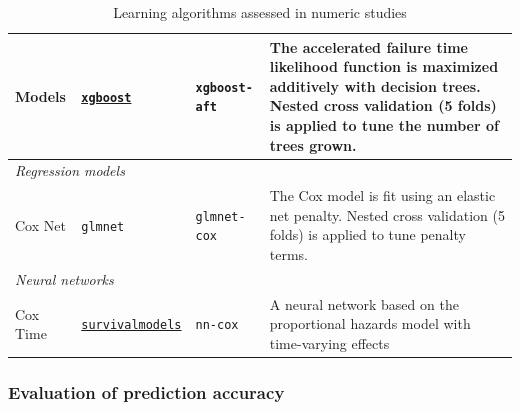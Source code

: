 \documentclass[twoside,11pt]{article}\usepackage[]{graphicx}\usepackage[]{color}
\begin{document}
\begin{landscape}
\begin{table}[h!]
\begin{tabular}{p{2cm} | p{3cm} p{4cm} p{12cm}}
 Models & \href{https://xgboost.readthedocs.io/en/stable/#}{\texttt{xgboost}} & \texttt{xgboost-aft} & The accelerated failure time likelihood function is maximized additively with decision trees. Nested cross validation (5 folds) is applied to tune the number of trees grown.  \\
 \hline\hline
 \multicolumn{3}{l}{\textit{Regression models}}\\
 \hline\hline
 Cox Net & \texttt{glmnet} & \texttt{glmnet-cox} & The Cox model is fit using an elastic net penalty. Nested cross validation (5 folds) is applied to tune penalty terms.\\
 \hline\hline
 \multicolumn{3}{l}{\textit{Neural networks}}\\
 \hline\hline
 Cox Time & \href{https://raphaels1.github.io/survivalmodels/}{\texttt{survivalmodels}} & \texttt{nn-cox} & A neural network based on the proportional hazards model with time-varying effects  \\
 \hline
\end{tabular}
\caption{Learning algorithms assessed in numeric studies}
\label{table:learners}
\end{table}

\end{landscape}
\restoregeometry


\subsubsection{Evaluation of prediction accuracy} \label{sec:prediction_accuracy}
\end{document}
